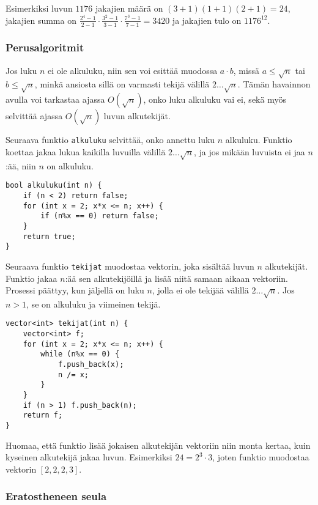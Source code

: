 Esimerkiksi luvun $1176$
jakajien määrä on $(3+1)(1+1)(2+1)=24$,
jakajien summa on $\frac{2^4-1}{2-1} \cdot \frac{3^2-1}{3-1} \cdot \frac{7^3-1}{7-1} = 3420$
ja jakajien tulo on $1176^{12}$.

\subsubsection{Perusalgoritmit}

Jos luku $n$ ei ole alkuluku,
niin sen voi esittää muodossa $a \cdot b$,
missä $a \le \sqrt n$ tai $b \le \sqrt n$,
minkä ansiosta sillä on varmasti
tekijä välillä $2 \ldots \sqrt n$.
Tämän havainnon avulla voi tarkastaa ajassa $O(\sqrt n)$,
onko luku alkuluku vai ei,
sekä myös selvittää ajassa $O(\sqrt n)$
luvun alkutekijät.

Seuraava funktio \texttt{alkuluku} selvittää,
onko annettu luku $n$ alkuluku.
Funktio koettaa jakaa lukua kaikilla luvuilla
välillä $2 \ldots \sqrt n$, ja jos mikään
luvuista ei jaa $n$:ää, niin $n$ on alkuluku.

\begin{lstlisting}
bool alkuluku(int n) {
    if (n < 2) return false;
    for (int x = 2; x*x <= n; x++) {
        if (n%x == 0) return false;
    }
    return true;
}
\end{lstlisting}

\noindent
Seuraava funktio \texttt{tekijat} muodostaa
vektorin, joka sisältää luvun $n$
alkutekijät.
Funktio jakaa $n$:ää sen alkutekijöillä ja lisää
niitä samaan aikaan vektoriin.
Prosessi päättyy, kun jäljellä on luku $n$,
jolla ei ole tekijää välillä $2 \ldots \sqrt n$.
Jos $n>1$, se on alkuluku ja viimeinen tekijä.

\begin{lstlisting}
vector<int> tekijat(int n) {
    vector<int> f;
    for (int x = 2; x*x <= n; x++) {
        while (n%x == 0) {
            f.push_back(x);
            n /= x;
        }
    }
    if (n > 1) f.push_back(n);
    return f;
}
\end{lstlisting}

Huomaa, että funktio lisää jokaisen
alkutekijän vektoriin
niin monta kertaa, kuin kyseinen
alkutekijä jakaa luvun.
Esimerkiksi $24=2^3 \cdot 3$,
joten funktio muodostaa vektorin $[2,2,2,3]$.

\subsubsection{Eratostheneen seula}

